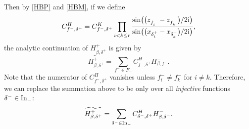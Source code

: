 \documentclass[pdftex]{sigma}
\numberwithin{equation}{section}
\newcommand{\z}{z}
\newcommand{\x}{x}
\begin{document}
Then by \eqref{HBP} and \eqref{HBM}, if we define
\[
C^H_{f^-, \delta^+} = C^K_{f^-, \delta^+} \prod_{i<k\leq r} \frac{\sin\bigl(\bigl(\z_{f^-_i} - \z_{f^-_k}\bigr)/2{\rm i}\bigr)}{ \sin\bigl(\bigl(\x_{\delta^+_i} - \x_{\delta^+_k}\bigr)/2{\rm i}\bigr)},
\]
the analytic continuation of $H^{+}_{\beta, \delta^+}$ is given by
\[
\widetilde{H^{+}_{\beta, \delta^+}} =\sum_{f^- \in F_-} C^H_{f^-, \delta^+} H^{-}_{\beta, f^-}.
\]
Note that the numerator of $C^H_{f^-, \delta^+}$ vanishes unless $f^-_i \neq f^-_k$ for $i \neq k$. Therefore, we can replace the summation above to be only over all \emph{injective} functions $\delta^- \in {\rm In}_-$:
\begin{equation}\label{e: CH} \widetilde{H^{+}_{\beta, \delta^+}} = \sum_{\delta^- \in {\rm In}_-} C^H_{\delta^-, \delta^+} H^{-}_{\beta, \delta^-}.\end{equation}
\end{document}
